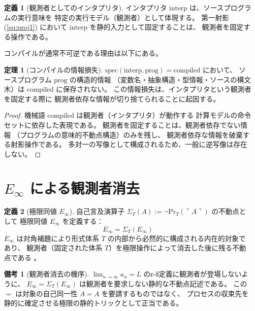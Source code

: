 \documentclass[11pt,a4paper]{article}
\newcommand{\Einfty}{E_\infty}
\newcommand{\SelfRef}{\Sigma}
\renewcommand{\Pr}{\mathrm{Pr}}
\theoremstyle{definition}
\newtheorem{definition}{定義}[section]
\newtheorem{theorem}{定理}[section]
\newtheorem{remark}{備考}[section]
\begin{document}
\begin{definition}[観測者としてのインタプリタ]
インタプリタ $\text{interp}$ は、ソースプログラムの実行意味を
特定の実行モデル（観測者）として体現する。
第一射影 (\ref{eq:proj1}) において $\text{interp}$ を静的入力として固定することは、
観測者を固定する操作である。
\end{definition}

コンパイルが通常不可逆である理由は以下にある。

\begin{theorem}[コンパイルの情報損失]
$\mathrm{spec}(\text{interp}, \text{prog}) = \text{compiled}$ において、
ソースプログラム $\text{prog}$ の構造的情報
（変数名・抽象構造・型情報・ソースの構文木）は
$\text{compiled}$ に保存されない。
この情報損失は、インタプリタという観測者を固定する際に
観測者依存な情報が切り捨てられることに起因する。
\end{theorem}

\begin{proof}
機械語 $\text{compiled}$ は観測者（インタプリタ）が動作する
計算モデルの命令セットに依存した表現である。
観測者を固定することは、観測者依存でない情報
（プログラムの意味的不動点構造）のみを残し、
観測者依存な情報を破棄する射影操作である。
多対一の写像として構成されるため、一般に逆写像は存在しない。
\end{proof}

\section{$\Einfty$ による観測者消去}

\begin{definition}[極限同値 $\Einfty$]
自己言及演算子 $\SelfRef_T(A) := \neg \Pr_T(\ulcorner A \urcorner)$ の不動点として
極限同値 $\Einfty$ を定義する：
$$\Einfty = \SelfRef_T(\Einfty)$$
$\Einfty$ は対角補題により形式体系 $T$ の内部から必然的に構成される内在的対象であり、
観測者（固定された体系 $T$）を極限操作によって消去した後に残る不動点である
\cite{Chiba2026_einfty}。
\end{definition}

\begin{remark}[観測者消去の機序]
$\lim_{n\to\infty} a_n = L$ のε-δ定義に観測者が登場しないように、
$\Einfty = \SelfRef_T(\Einfty)$ は観測者を要求しない静的な不動点記述である。
この $=$ は対象の自己同一性 $A=A$ を要請するものではなく、
プロセスの収束先を静的に確定させる極限の静的トリックとして正当である。
\end{remark}
\end{document}
